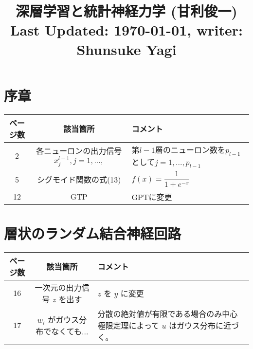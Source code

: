 \documentclass{jsarticle}
\title{深層学習と統計神経力学 (甘利俊一) \\[2ex] \large Last Updated: \today, \quad writer: Shunsuke Yagi}
\author{}
\date{}
\begin{document}
\setcounter{section}{-1}
\maketitle
\section{序章}
\begin{table}[H]
  \centering
  \begin{tabular}{|c|c|p{10 cm}|}
      \hline
      ページ数 & 該当箇所 & コメント \\ \hline
      2 & 各ニューロンの出力信号$x^{l-1}_j,j=1,...,$ & 第$l-1$層のニューロン数を$p_{l-1}$として$j=1,...,p_{l-1}$ \\ \hline
      5 & シグモイド関数の式(13) & $f(x)=\dfrac{1}{1+e^{-x}}$ \\ \hline
      12 & GTP & GPTに変更 \\ \hline
  \end{tabular}
  \label{tab:mem}
\end{table}
\section{層状のランダム結合神経回路}
\begin{table}[H]
  \centering
  \begin{tabular}{|c|c|p{10 cm}|}
      \hline
      ページ数 & 該当箇所 & コメント \\ \hline
      16 & 一次元の出力信号 $z$ を出す & $z$ を $y$ に変更 \\ \hline
      17 & $w_i$ がガウス分布でなくても... & 分散の絶対値が有限である場合のみ中心極限定理によって $u$ はガウス分布に近づく。 \\ \hline
  \end{tabular}
  \label{tab:mem}
\end{table}
\end{document}
